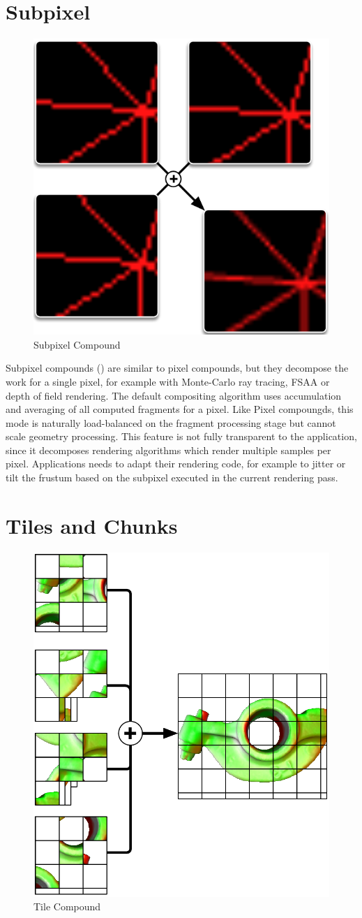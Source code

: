 \section{Subpixel}

\begin{figure}
 \includegraphics[width=.382\textwidth]{images/Subpixel}
 {\caption{\label{fSubpixel}Subpixel Compound}}
\end{figure}

Subpixel compounds () are similar to pixel compounds, but they
decompose the work for a single pixel, for example with Monte-Carlo ray tracing,
FSAA or depth of field rendering. The default compositing algorithm uses
accumulation and averaging of all computed fragments for a pixel. Like Pixel
compoungds, this mode is naturally load-balanced on the fragment processing
stage but cannot scale geometry processing. This feature is not fully
transparent to the application, since it decomposes rendering algorithms which
render multiple samples per pixel. Applications needs to adapt their rendering
code, for example to jitter or tilt the frustum based on the subpixel executed
in the current rendering pass.

\section{Tiles and Chunks\label{sTile}}

\begin{figure}
 \includegraphics[width=.382\textwidth]{images/tile}
 {\caption{\label{fTiles}Tile Compound}}
\end{figure}

